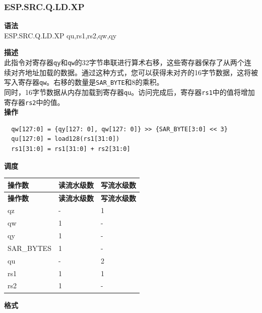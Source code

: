 \subsubsection{ESP.SRC.Q.LD.XP}\label{instruction:ESPSRCQLDXP}
\textbf{语法}\\
ESP.SRC.Q.LD.XP qu,rs1,rs2,qw,qy

\textbf{描述}\\
此指令对寄存器\lstinline{qy}和\lstinline{qw}的32字节串联进行算术右移，这些寄存器保存了从两个连续对齐地址加载的数据。通过这种方式，您可以获得未对齐的16字节数据，这将被写入寄存器\lstinline{qw}。右移的数量是\lstinline{SAR_BYTE}和8的乘积。\\
同时，16字节数据从内存加载到寄存器\lstinline{qu}。访问完成后，寄存器\lstinline{rs1}中的值将增加寄存器\lstinline{rs2}中的值。\\
\textbf{操作}
\begin{lstlisting}
  qw[127:0] = {qy[127: 0], qw[127: 0]} >> {SAR_BYTE[3:0] << 3}
  qu[127:0] = load128(rs1[31:0])
  rs1[31:0] = rs1[31:0] + rs2[31:0]
\end{lstlisting}

\textbf{调度}\\
\begin{longtable}[c]{|l|l|l|}
    \hline
    \rowcolor{lightgray}
    \textbf{操作数} & \textbf{读流水级数} & \textbf{写流水级数} \\\hline
    \endfirsthead
    \hline
    \rowcolor{lightgray}
     \textbf{操作数} & \textbf{读流水级数} & \textbf{写流水级数} \\\hline
    \endhead
    \hline
    \endfoot

  qz & - & 1 \\\hline
  qw & 1 & - \\\hline
  qy & 1 & - \\\hline
  SAR\_BYTES & 1 & - \\\hline
  qu & - & 2 \\\hline
  rs1 & 1 & 1 \\\hline
  rs2 & 1 & -

\end{longtable}

\textbf{格式}\\


